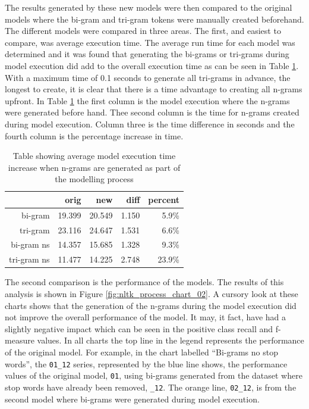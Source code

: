 The results generated by these new models were then compared to the original models where the bi-gram and tri-gram tokens were manually created beforehand. The different models were compared in three areas. The first, and easiest to compare, was average execution time. The average run time for each model was determined and it was found that generating the bi-grams or tri-grams during model execution did add to the overall execution time as can be seen in Table \ref{tab:chapter5:ngram_generation}. With a maximum time of 0.1 seconds to generate all tri-grams in advance, the longest to create, it is clear that there is a time advantage to creating all n-grams upfront. In Table \ref{tab:chapter5:ngram_generation} the first column is the model execution where the n-grams were generated before hand. Thee second column is the time for n-grams created during model execution. Column three is the time difference in seconds and the fourth column is the percentage increase in time.

\begin{table}[h]
\centering
\caption[N-gram generation increases execution time]{Table showing average model execution time increase when n-grams are generated as part of the modelling process}
\label{tab:chapter5:ngram_generation}
\begin{tabular}{rrrrr}
	\toprule
     & \textbf{orig}  & \textbf{new} & \textbf{diff} & \textbf{percent}    \\
    \midrule
    bi-gram & 19.399 & 20.549 & 1.150 & 5.9\%  \\
    tri-gram & 23.116 & 24.647 & 1.531 & 6.6\%  \\
    bi-gram ns & 14.357 & 15.685 & 1.328 & 9.3\%   \\
    tri-gram ns & 11.477 & 14.225 & 2.748 & 23.9\%   \\
    \bottomrule
    \end{tabular}
\end{table}

The second comparison is the performance of the models. The results of this analysis is shown in Figure \ref{fig:nltk_process_chart_02}. A cursory look at these charts  shows that the generation of the n-grams during the model execution did not improve the overall performance of the model. It may, it fact, have had a slightly negative impact which can be seen in the positive class recall and f-measure values. In all charts the top line in the legend represents the performance of the original model. For example, in the chart labelled ``Bi-grams no stop words'', the \verb|01_12| series, represented by the blue line shows, the performance values of the original model, \verb|01|, using bi-grams generated from the dataset where stop words have already been removed, \verb|_12|. The orange line, \verb|02_12|, is from the second model where bi-grams were generated during model execution.

